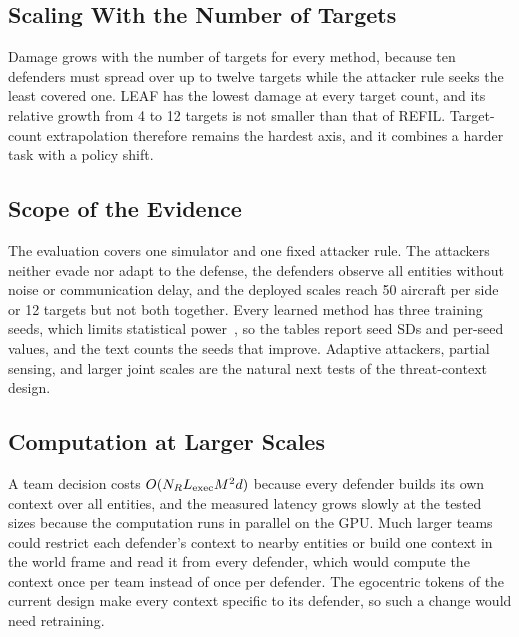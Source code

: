 \subsection{Scaling With the Number of Targets}
Damage grows with the number of targets for every method, because ten defenders must spread over up to twelve targets while the attacker rule seeks the least covered one. LEAF has the lowest damage at every target count, and its relative growth from 4 to 12 targets is not smaller than that of REFIL. Target-count extrapolation therefore remains the hardest axis, and it combines a harder task with a policy shift.

\subsection{Scope of the Evidence}
The evaluation covers one simulator and one fixed attacker rule. The attackers neither evade nor adapt to the defense, the defenders observe all entities without noise or communication delay, and the deployed scales reach 50 aircraft per side or 12 targets but not both together. Every learned method has three training seeds, which limits statistical power~\cite{agarwal2021rliable}, so the tables report seed SDs and per-seed values, and the text counts the seeds that improve. Adaptive attackers, partial sensing, and larger joint scales are the natural next tests of the threat-context design.

\subsection{Computation at Larger Scales}
A team decision costs $O(N_RL_{\rm exec}M^2d)$ because every defender builds its own context over all entities, and the measured latency grows slowly at the tested sizes because the computation runs in parallel on the GPU. Much larger teams could restrict each defender's context to nearby entities or build one context in the world frame and read it from every defender, which would compute the context once per team instead of once per defender. The egocentric tokens of the current design make every context specific to its defender, so such a change would need retraining.

